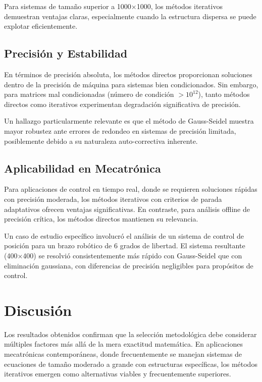 \documentclass[conference]{IEEEtran}
\begin{document}
Para sistemas de tamaño superior a 1000×1000, los métodos iterativos demuestran ventajas claras, especialmente cuando la estructura dispersa se puede explotar eficientemente.

\subsection{Precisión y Estabilidad}

En términos de precisión absoluta, los métodos directos proporcionan soluciones dentro de la precisión de máquina para sistemas bien condicionados. Sin embargo, para matrices mal condicionadas (número de condición $> 10^{12}$), tanto métodos directos como iterativos experimentan degradación significativa de precisión.

Un hallazgo particularmente relevante es que el método de Gauss-Seidel muestra mayor robustez ante errores de redondeo en sistemas de precisión limitada, posiblemente debido a su naturaleza auto-correctiva inherente.

\subsection{Aplicabilidad en Mecatrónica}

Para aplicaciones de control en tiempo real, donde se requieren soluciones rápidas con precisión moderada, los métodos iterativos con criterios de parada adaptativos ofrecen ventajas significativas. En contraste, para análisis offline de precisión crítica, los métodos directos mantienen su relevancia.

Un caso de estudio específico involucró el análisis de un sistema de control de posición para un brazo robótico de 6 grados de libertad. El sistema resultante (400×400) se resolvió consistentemente más rápido con Gauss-Seidel que con eliminación gaussiana, con diferencias de precisión negligibles para propósitos de control.

\section{Discusión}

Los resultados obtenidos confirman que la selección metodológica debe considerar múltiples factores más allá de la mera exactitud matemática. En aplicaciones mecatrónicas contemporáneas, donde frecuentemente se manejan sistemas de ecuaciones de tamaño moderado a grande con estructuras específicas, los métodos iterativos emergen como alternativas viables y frecuentemente superiores.
\end{document}
